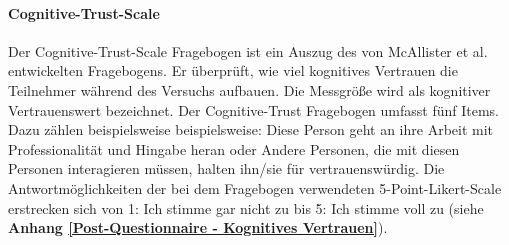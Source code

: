 \documentclass[a4paper,11pt]{article}%
\renewcommand{\\}{\vspace*{0.5\baselineskip} \newline}
\begin{document}
%			

		\paragraph{Cognitive-Trust-Scale}
Der Cognitive-Trust-Scale Fragebogen ist ein Auszug des von McAllister et al. \citep[S.37]{mcallister1995affect} entwickelten Fragebogens. Er überprüft, wie viel kognitives Vertrauen die Teilnehmer während des Versuchs aufbauen. Die Messgröße wird als kognitiver Vertrauenswert bezeichnet. Der Cognitive-Trust Fragebogen umfasst fünf Items. Dazu zählen beispielsweise beispielsweise: \glqq{}Diese Person geht an ihre Arbeit mit Professionalität und Hingabe heran\dq{} oder \glqq{}Andere Personen, die mit diesen Personen interagieren müssen, halten ihn/sie für vertrauenswürdig\dq{}. Die Antwortmöglichkeiten der bei dem Fragebogen verwendeten 5-Point-Likert-Scale erstrecken sich von 1: \glqq{}Ich stimme gar nicht zu \dq{} bis 5: \glqq{}Ich stimme voll zu\dq{} (siehe \textbf{Anhang \ref{Post-Questionnaire - Kognitives Vertrauen}}).

\end{document}
